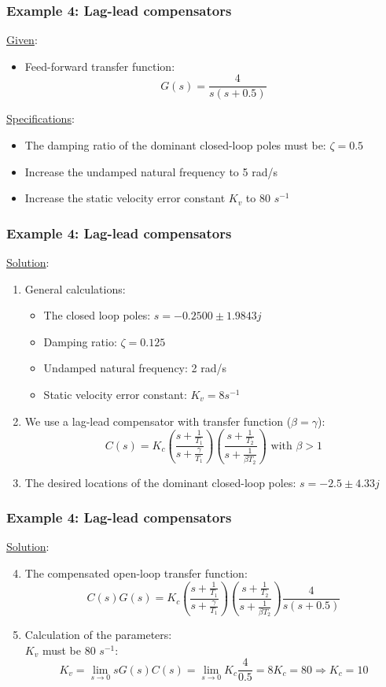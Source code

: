 \begin{frame}
	\frametitle{Example 4: Lag-lead compensators}
	\underline{Given}:
	\begin{itemize}
		\item Feed-forward transfer function: $$G(s)=\frac{4}{s(s+0.5)}$$
	\end{itemize}
	\underline{Specifications}:
	\begin{itemize}
		\item The damping ratio of the dominant closed-loop poles must be: $\zeta=0.5$
		\item Increase the undamped natural frequency to 5 rad/s
		\item Increase the static velocity error constant $K_v$ to 80 $s^{-1}$
	\end{itemize}
\end{frame}

\begin{frame}
	\frametitle{Example 4: Lag-lead compensators}
	\underline{Solution}:
	\begin{enumerate}
		\item General calculations:
		\begin{itemize}
			\item The closed loop poles: $s=-0.2500\pm1.9843j$
			\item Damping ratio: $\zeta=0.125$
			\item Undamped natural frequency: 2 rad/s
			\item Static velocity error constant: $K_v=8s^{-1}$
		\end{itemize}
		\item We use a lag-lead compensator with transfer function ($\beta=\gamma$):
		$$C(s)=K_c(\frac{s+\frac{1}{T_1}}{s+\frac{\gamma}{T_1}})(\frac{s+\frac{1}{T_2}}{s+\frac{1}{\beta T_2}}) \text{ with } \beta>1$$
		\item The desired locations of the dominant closed-loop poles: $s=-2.5\pm 4.33j$
	\end{enumerate}
\end{frame}

\begin{frame}
	\frametitle{Example 4: Lag-lead compensators}
	\underline{Solution}:
	\begin{enumerate}
		\setcounter{enumi}{3}
		\item The compensated open-loop transfer function:
		$$C(s)G(s)=K_c (\frac{s+\frac{1}{T_1}}{s+\frac{\gamma}{T_1}})(\frac{s+\frac{1}{T_2}}{s+\frac{1}{\beta T_2}})\frac{4}{s(s+0.5)}$$
		\item Calculation of the parameters:\\
		$K_v$ must be 80 $s^{-1}$:
		$$K_v=\lim_{s\to0}sG(s)C(s)=\lim_{s\to0}K_c\frac{4}{0.5}=8K_c=80 \Rightarrow K_c=10$$
	\end{enumerate}
\end{frame}

